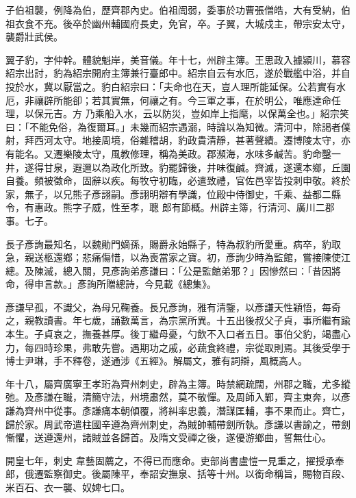 \begin{pinyinscope}
 子伯祖襲，例降為伯，歷齊郡內史。伯祖訚弱，委事於功曹張僧皓，大有受納，伯祖衣食不充。後卒於幽州輔國府長史，免官，卒。子翼，大城戍主，帶宗安太守，襲爵壯武侯。



 翼子豹，字仲幹。體貌魁岸，美音儀。年十七，州辟主簿。王思政入據潁川，慕容紹宗出討，豹為紹宗開府主簿兼行臺郎中。紹宗自云有水厄，遂於戰艦中浴，并自投於水，冀以厭當之。豹白紹宗曰：「夫命也在天，豈人理所能延保。公若實有水厄，非禳辟所能卻；若其實無，何禳之有。今三軍之事，在於明公，唯應達命任理，以保元吉。方
 乃乘船入水，云以防災，豈如岸上指麾，以保萬全也。」紹宗笑曰：「不能免俗，為復爾耳。」未幾而紹宗遇溺，時論以為知微。清河中，除謁者僕射，拜西河太守。地接周境，俗雜稽胡，豹政貴清靜，甚著聲績。遷博陵太守，亦有能名。又遷樂陵太守，風教修理，稱為美政。郡瀕海，水味多鹹苦。豹命鑿一井，遂得甘泉，遐邇以為政化所致。豹罷歸後，井味復鹹。齊滅，遂還本鄉，丘園自養。頻被徵命，固辭以疾。每牧守初臨，必遣致禮，官佐邑宰皆投刺申敬。終於家，無子，以兄熊子彥詡嗣。彥詡明辯有學識，位殿中侍御史，千乘、益都二縣令，有惠政。熊字子威，性至孝，聰
 郎有節概。州辟主簿，行清河、廣川二郡事。七子。



 長子彥詢最知名，以魏勛門嫡孫，賜爵永始縣子，特為叔豹所愛重。病卒，豹取急，親送柩還鄉；悲痛傷惜，以為喪當家之寶。初，彥詢少時為監館，嘗接陳使江總。及陳滅，總入關，見彥詢弟彥謙曰：「公是監館弟邪？」因慘然曰：「昔因將命，得申言款。」彥詢所贈總詩，今見載《總集》。



 彥謙早孤，不識父，為母兄鞠養。長兄彥詢，雅有清鑒，以彥謙天性穎悟，每奇之，親教讀書。年七歲，誦數萬言，為宗黨所異。十五出後叔父子貞，事所繼有踰本生。子貞哀之，撫養甚厚。後丁繼母憂，勺飲不入口者五日。事伯父豹，竭盡心
 力，每四時珍果，弗敢先嘗。遇期功之戚，必蔬食終禮，宗從取則焉。其後受學于博士尹琳，手不釋卷，遂通涉《五經》。解屬文，雅有詞辯，風概高人。



 年十八，屬齊廣寧王孝珩為齊州刺史，辟為主簿。時禁網疏闊，州郡之職，尤多縱弛。及彥謙在職，清簡守法，州境肅然，莫不敬憚。及周師入鄴，齊主東奔，以彥謙為齊州中從事。彥謙痛本朝傾覆，將糾率忠義，潛謀匡輔，事不果而止。齊亡，歸於家。周武帝遣柱國辛遵為齊州刺史，為賊帥輔帶劍所執。彥謙以書諭之，帶劍慚懼，送遵還州，諸賊並各歸首。及隋文受禪之後，遂優游鄉曲，誓無仕心。



 開皇七年，刺史
 韋藝固薦之，不得已而應命。吏部尚書盧愷一見重之，擢授承奉郎，俄遷監察御史。後屬陳平，奉詔安撫泉、括等十州。以銜命稱旨，賜物百段、米百石、衣一襲、奴婢七口。




\end{pinyinscope}

